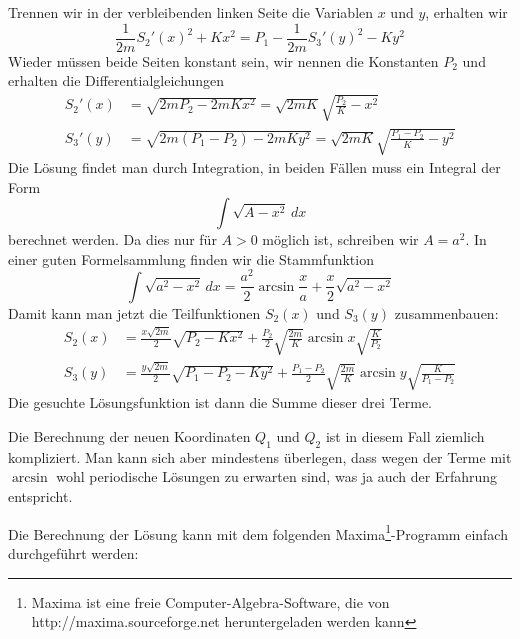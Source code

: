 \begin{loesung}
Trennen wir in der verbleibenden linken Seite die Variablen $x$ und $y$,
erhalten wir
\[
\frac1{2m}S_2'(x)^2+Kx^2
=
P_1-
\frac1{2m}S_3'(y)^2-Ky^2
\]
Wieder müssen beide Seiten konstant sein, wir nennen die Konstanten $P_2$
und erhalten die Differentialgleichungen
\begin{align*}
S_2'(x)&=\sqrt{2mP_2-2mKx^2}=\sqrt{2mK}\sqrt{\frac{P_2}{K}-x^2}\\
S_3'(y)&=\sqrt{2m(P_1-P_2)-2mKy^2}=\sqrt{2mK}\sqrt{\frac{P_1-P_2}{K}-y^2}
\end{align*}
Die Lösung findet man durch Integration, in beiden Fällen muss ein 
Integral der Form
\[
\int \sqrt{A-x^2}\,dx
\]
berechnet werden.
Da dies nur für $A>0$ möglich ist, schreiben wir $A=a^2$.
In einer guten Formelsammlung finden wir die Stammfunktion
\[
\int\sqrt{a^2-x^2}\,dx
=
\frac{a^2}2\arcsin\frac{x}{a}+\frac{x}2\sqrt{a^2-x^2}
\]
Damit kann man jetzt die Teilfunktionen $S_2(x)$ und $S_3(y)$
zusammenbauen:
\begin{align*}
S_2(x)
&=
\frac{x\sqrt{2m}}2\sqrt{P_2-Kx^2}
+
\frac{P_2}{2}\sqrt{\frac{2m}{K}}\arcsin x\sqrt{\frac{K}{P_2}}
\\
S_3(y)
&=
\frac{y\sqrt{2m}}2\sqrt{P_1-P_2-Ky^2}
+
\frac{P_1-P_2}2 \sqrt{\frac{2m}{K}}\arcsin y\sqrt{\frac{K}{P_1-P_2}}
\end{align*}
Die gesuchte Lösungsfunktion ist dann die Summe dieser drei Terme.
\end{loesung}

\begin{diskussion}
Die Berechnung der neuen Koordinaten $Q_1$ und $Q_2$ ist in diesem
Fall ziemlich kompliziert. Man kann sich aber mindestens überlegen,
dass wegen der Terme mit $\arcsin$ wohl periodische Lösungen zu
erwarten sind, was ja auch der Erfahrung entspricht.

Die Berechnung der Lösung kann mit dem folgenden Maxima\footnote{Maxima
ist eine freie Computer-Algebra-Software, die von
http://maxima.sourceforge.net heruntergeladen werden kann}-Programm
einfach durchgeführt werden:
\begin{small}
\end{small}
\end{diskussion}
